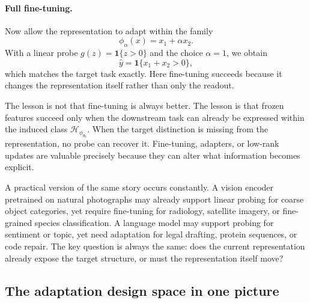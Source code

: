 \paragraph{Full fine-tuning.}
Now allow the representation to adapt within the family
\[
\phi_{\alpha}(x) = x_1 + \alpha x_2.
\]
With a linear probe $g(z) = \mathbf{1}\{z > 0\}$ and the choice $\alpha = 1$, we obtain
\[
\hat y = \mathbf{1}\{x_1 + x_2 > 0\},
\]
which matches the target task exactly.
Here fine-tuning succeeds because it changes the representation itself rather than only the readout.

\begin{example}
The lesson is not that fine-tuning is always better.
The lesson is that frozen features succeed only when the downstream task can already be expressed within the induced class $\mathcal{H}_{\phi_{\theta_0}}$.
When the target distinction is missing from the representation, no probe can recover it.
Fine-tuning, adapters, or low-rank updates are valuable precisely because they can alter what information becomes explicit.
\end{example}

A practical version of the same story occurs constantly.
A vision encoder pretrained on natural photographs may already support linear probing for coarse object categories, yet require fine-tuning for radiology, satellite imagery, or fine-grained species classification.
A language model may support probing for sentiment or topic, yet need adaptation for legal drafting, protein sequences, or code repair.
The key question is always the same:
does the current representation already expose the target structure, or must the representation itself move?

\subsection*{The adaptation design space in one picture}

